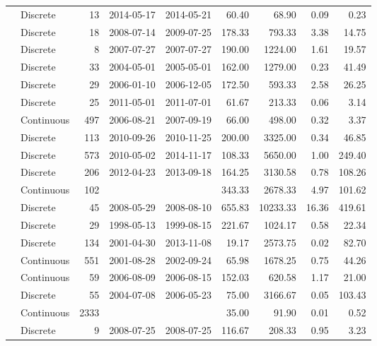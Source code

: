 \begin{table}[ht]
\begin{tabular}{llrllrrrr}
  \citet{Gonnelli2016} & Discrete &  13 & 2014-05-17 & 2014-05-21 & 60.40 & 68.90 & 0.09 & 0.23 \\ 
  \citet{Griffin2011} & Discrete &  18 & 2008-07-14 & 2009-07-25 & 178.33 & 793.33 & 3.38 & 14.75 \\ 
  \citet{Gueguen2011} & Discrete &   8 & 2007-07-27 & 2007-07-27 & 190.00 & 1224.00 & 1.61 & 19.57 \\ 
  \citet{Helms2008} & Discrete &  33 & 2004-05-01 & 2005-05-01 & 162.00 & 1279.00 & 0.23 & 41.49 \\ 
  \citet{Hernes2008} & Discrete &  29 & 2006-01-10 & 2006-12-05 & 172.50 & 593.33 & 2.58 & 26.25 \\ 
  \citet{Hur2014} & Discrete &  25 & 2011-05-01 & 2011-07-01 & 61.67 & 213.33 & 0.06 & 3.14 \\ 
  \citet{kattegat} & Continuous & 497 & 2006-08-21 & 2007-09-19 & 66.00 & 498.00 & 0.32 & 3.37 \\ 
  \citet{Kellerman2015} & Discrete & 113 & 2010-09-26 & 2010-11-25 & 200.00 & 3325.00 & 0.34 & 46.85 \\ 
  \citet{Lambert2015a} & Discrete & 573 & 2010-05-02 & 2014-11-17 & 108.33 & 5650.00 & 1.00 & 249.40 \\ 
  \citet{Loken2016} & Discrete & 206 & 2012-04-23 & 2013-09-18 & 164.25 & 3130.58 & 0.78 & 108.26 \\ 
  \citet{lter2004} & Continuous & 102 &  &  & 343.33 & 2678.33 & 4.97 & 101.62 \\ 
  \citet{lter2008} & Discrete &  45 & 2008-05-29 & 2008-08-10 & 655.83 & 10233.33 & 16.36 & 419.61 \\ 
  \citet{lter5653} & Discrete &  29 & 1998-05-13 & 1999-08-15 & 221.67 & 1024.17 & 0.58 & 22.34 \\ 
  \citet{lter5689} & Discrete & 134 & 2001-04-30 & 2013-11-08 & 19.17 & 2573.75 & 0.02 & 82.70 \\ 
  \citet{Markager2011} & Continuous & 551 & 2001-08-28 & 2002-09-24 & 65.98 & 1678.25 & 0.75 & 44.26 \\ 
  \citet{Massicotte2011EA} & Continuous &  59 & 2006-08-09 & 2006-08-15 & 152.03 & 620.58 & 1.17 & 21.00 \\ 
  \citet{Moran2006} & Discrete &  55 & 2004-07-08 & 2006-05-23 & 75.00 & 3166.67 & 0.05 & 103.43 \\ 
  \citet{Nelson2002, Nelson2007, Nelson2010} & Continuous & 2333 &  &  & 35.00 & 91.90 & 0.01 & 0.52 \\ 
  \citet{Nguyen2010} & Discrete &   9 & 2008-07-25 & 2008-07-25 & 116.67 & 208.33 & 0.95 & 3.23 \\ 

\end{tabular}
\end{table}

